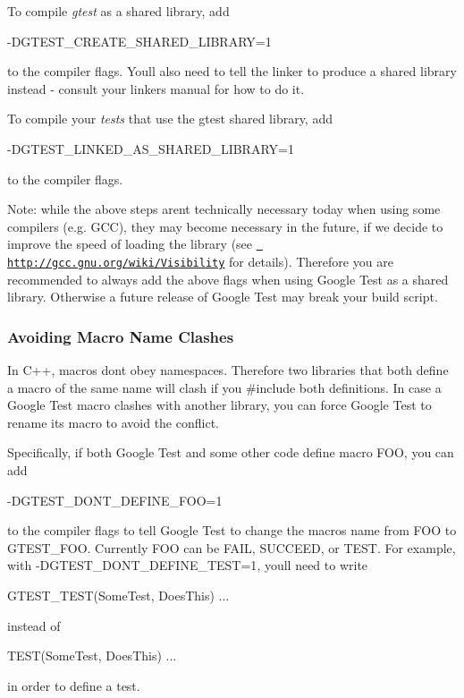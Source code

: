 To compile {\itshape gtest} as a shared library, add \begin{DoxyVerb}-DGTEST_CREATE_SHARED_LIBRARY=1
\end{DoxyVerb}


to the compiler flags. You\textquotesingle{}ll also need to tell the linker to produce a shared library instead -\/ consult your linker\textquotesingle{}s manual for how to do it.

To compile your {\itshape tests} that use the gtest shared library, add \begin{DoxyVerb}-DGTEST_LINKED_AS_SHARED_LIBRARY=1
\end{DoxyVerb}


to the compiler flags.

Note\+: while the above steps aren\textquotesingle{}t technically necessary today when using some compilers (e.\+g. G\+CC), they may become necessary in the future, if we decide to improve the speed of loading the library (see \href{http://gcc.gnu.org/wiki/Visibility}{\texttt{ http\+://gcc.\+gnu.\+org/wiki/\+Visibility}} for details). Therefore you are recommended to always add the above flags when using Google Test as a shared library. Otherwise a future release of Google Test may break your build script.

\subsubsection*{Avoiding Macro Name Clashes}

In C++, macros don\textquotesingle{}t obey namespaces. Therefore two libraries that both define a macro of the same name will clash if you {\ttfamily \#include} both definitions. In case a Google Test macro clashes with another library, you can force Google Test to rename its macro to avoid the conflict.

Specifically, if both Google Test and some other code define macro F\+OO, you can add \begin{DoxyVerb}-DGTEST_DONT_DEFINE_FOO=1
\end{DoxyVerb}


to the compiler flags to tell Google Test to change the macro\textquotesingle{}s name from {\ttfamily F\+OO} to {\ttfamily G\+T\+E\+S\+T\+\_\+\+F\+OO}. Currently {\ttfamily F\+OO} can be {\ttfamily F\+A\+IL}, {\ttfamily S\+U\+C\+C\+E\+ED}, or {\ttfamily T\+E\+ST}. For example, with {\ttfamily -\/D\+G\+T\+E\+S\+T\+\_\+\+D\+O\+N\+T\+\_\+\+D\+E\+F\+I\+N\+E\+\_\+\+T\+E\+ST=1}, you\textquotesingle{}ll need to write \begin{DoxyVerb}GTEST_TEST(SomeTest, DoesThis) { ... }
\end{DoxyVerb}


instead of \begin{DoxyVerb}TEST(SomeTest, DoesThis) { ... }
\end{DoxyVerb}


in order to define a test. 